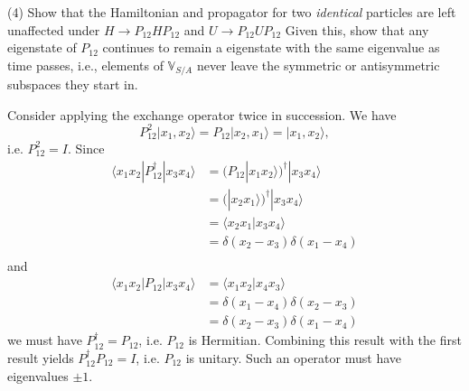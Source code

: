 \documentclass[../principles-of-quantum-mechanics.tex]{subfiles}
\begin{document}
\begin{questions}
		(4) Show that the Hamiltonian and propagator for two \textit{identical} particles are left unaffected under $H\to P_{12}HP_{12}$ and $U\to P_{12}UP_{12}$ Given this, show that any eigenstate of $P_{12}$ continues to remain a eigenstate with the same eigenvalue as time passes, i.e., elements of $\mathbb{V}_{S/A}$ never leave the symmetric or antisymmetric subspaces they start in.
		
		\begin{solution}
			Consider applying the exchange operator twice in succession. We have
			$$P_{12}^2|x_1, x_2\rangle = P_{12}|x_2, x_1\rangle = |x_1, x_2\rangle,$$
			i.e. $P_{12}^2 = I$. Since
			\begin{align*}
				\langle x_1x_2|P_{12}^\dagger|x_3x_4\rangle &= \big(P_{12}|x_1x_2\rangle\big)^\dagger|x_3x_4\rangle \\
				&= \big(|x_2x_1\rangle\big)^\dagger|x_3x_4\rangle \\
				&= \langle x_2x_1|x_3x_4\rangle \\
				&= \delta(x_2-x_3)\delta(x_1-x_4) \\
			\end{align*}
			and
			\begin{align*}
				\langle x_1x_2|P_{12}|x_3x_4\rangle &= \langle x_1x_2|x_4x_3\rangle \\
				&= \delta(x_1 - x_4)\delta(x_2-x_3) \\
				&= \delta(x_2-x_3)\delta(x_1 - x_4)
			\end{align*}
			we must have $P_{12}^\dagger = P_{12}$, i.e. $P_{12}$ is Hermitian. Combining this result with the first result yields $P_{12}^\dagger P_{12} = I$, i.e. $P_{12}$ is unitary. Such an operator must have eigenvalues $\pm 1$.
			

\end{solution}
\end{questions}
\end{document}
